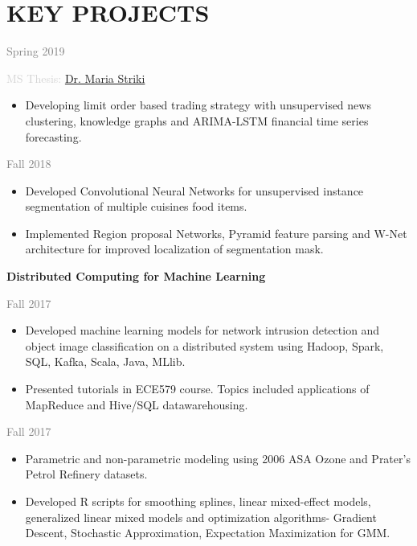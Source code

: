 \documentclass[]{mycv} %
\begin{document}
{{\section{KEY PROJECTS}
{\large\textbf{\color{lightgray}{Using News and Supply Chain Data to Predict Stock Price Movements}}}\hfill{\textcolor{gray}{Spring 2019}} \\
{\textcolor{lightgray}{MS Thesis: \href{https://www.ece.rutgers.edu/Striki}{Dr. Maria Striki}}
\begin{itemize}
	\vspace{-0.5em}
	\setlength\itemsep{-0.2em}		
	 \item Developing limit order based trading strategy with unsupervised news clustering, knowledge graphs and ARIMA-LSTM financial time series forecasting.
\end{itemize}
{\large\textbf{\color{lightgray}{Unsupervised Segmentation of Food Images}}}\hfill{\textcolor{gray}{Fall 2018}}
\begin{itemize}
	\vspace{-0.5em}
	\setlength\itemsep{-0.2em}		
	\item Developed Convolutional Neural Networks for unsupervised instance segmentation of multiple cuisines food items.
	\item Implemented Region proposal Networks, Pyramid feature parsing and W-Net architecture for improved localization of segmentation mask. 
\end{itemize}
{\large\textbf{\color{lightgray}Distributed Computing for Machine Learning}}}\hfill{\textcolor{gray}{Fall 2017}}
\begin{itemize}
	\vspace{-0.5em}
	\setlength\itemsep{-0.2em}		
	\item Developed machine learning models for network intrusion detection and object image classification on a distributed system using Hadoop, Spark, SQL, Kafka, Scala, Java, MLlib.
	\item Presented tutorials in ECE579 course. Topics included applications of MapReduce and Hive/SQL datawarehousing.
\end{itemize}
{\large\textbf{\color{lightgray}{Statistical Learning and Modeling }}}\hfill{\textcolor{gray}{Fall 2017}}
\begin{itemize}
	\vspace{-0.5em}
	\setlength\itemsep{-0.2em}		
	\item Parametric and non-parametric modeling using 2006 ASA Ozone and Prater's Petrol Refinery datasets.
	\item Developed R scripts for smoothing splines, linear mixed-effect models, generalized linear mixed models and optimization algorithms- Gradient Descent, Stochastic Approximation, Expectation Maximization for GMM.

\end{itemize}}}
\end{document}
